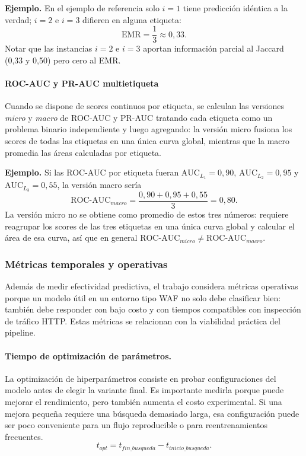 \documentclass[12pt,oneside]{report}
\begin{document}
\textbf{Ejemplo.} En el ejemplo de referencia solo $i=1$ tiene
predicción idéntica a la verdad; $i=2$ e $i=3$ difieren en alguna
etiqueta:
\[
\mathrm{EMR}=\frac{1}{3}\approx 0{,}33.
\]
Notar que las instancias $i=2$ e $i=3$ aportan información parcial al
Jaccard (0{,}33 y 0{,}50) pero cero al EMR.

\paragraph{ROC-AUC y PR-AUC multietiqueta}

Cuando se dispone de scores continuos por etiqueta, se calculan las
versiones \emph{micro} y \emph{macro} de ROC-AUC y PR-AUC tratando cada
etiqueta como un problema binario independiente y luego agregando: la
versión micro fusiona los scores de todas las etiquetas en una única
curva global, mientras que la macro promedia las áreas calculadas por
etiqueta.

\textbf{Ejemplo.} Si las ROC-AUC por etiqueta fueran $\mathrm{AUC}_{L_1}=0{,}90$,
$\mathrm{AUC}_{L_2}=0{,}95$ y $\mathrm{AUC}_{L_3}=0{,}55$, la versión
macro sería
\[
\mathrm{ROC\text{-}AUC}_{macro}=\frac{0{,}90+0{,}95+0{,}55}{3}=0{,}80.
\]
La versión micro no se obtiene como promedio de estos tres números:
requiere reagrupar los scores de las tres etiquetas en una única curva
global y calcular el área de esa curva, así que en general
$\mathrm{ROC\text{-}AUC}_{micro}\ne \mathrm{ROC\text{-}AUC}_{macro}$.

\subsubsection{Métricas temporales y operativas}

Además de medir efectividad predictiva, el trabajo considera métricas operativas porque un modelo útil en un entorno tipo WAF no solo debe clasificar bien: también debe responder con bajo costo y con tiempos compatibles con inspección de tráfico HTTP. Estas métricas se relacionan con la viabilidad práctica del pipeline.

\paragraph{Tiempo de optimización de parámetros.}
La optimización de hiperparámetros consiste en probar configuraciones del modelo antes de elegir la variante final. Es importante medirla porque puede mejorar el rendimiento, pero también aumenta el costo experimental. Si una mejora pequeña requiere una búsqueda demasiado larga, esa configuración puede ser poco conveniente para un flujo reproducible o para reentrenamientos frecuentes.
\[
t_{opt}=t_{fin\_busqueda}-t_{inicio\_busqueda}.
\]
\end{document}

